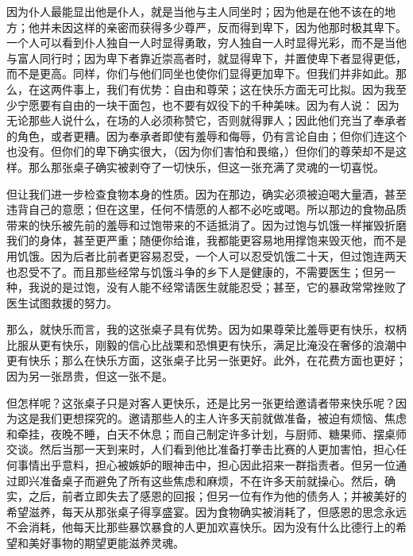 因为仆人最能显出他是仆人，就是当他与主人同坐时；因为他是在他不该在的地方；他并未因这样的亲密而获得多少尊严，反而得到卑下，因为他那时极其卑下。一个人可以看到仆人独自一人时显得勇敢，穷人独自一人时显得光彩，而不是当他与富人同行时；因为卑下者靠近崇高者时，就显得卑下，并置使卑下者显得更低，而不是更高。同样，你们与他们同坐也使你们显得更加卑下。但我们并非如此。那么，在这两件事上，我们有优势：自由和尊荣；这在快乐方面无可比拟。因为我至少宁愿要有自由的一块干面包，也不要有奴役下的千种美味。因为有人说： 因为无论那些人说什么，在场的人必须称赞它，否则就得罪人；因此他们充当了奉承者的角色，或者更糟。因为奉承者即使有羞辱和侮辱，仍有言论自由；但你们连这个也没有。但你们的卑下确实很大，（因为你们害怕和畏缩，）但你们的尊荣却不是这样。那么那张桌子确实被剥夺了一切快乐，但这一张充满了灵魂的一切喜悦。\par

但让我们进一步检查食物本身的性质。因为在那边，确实必须被迫喝大量酒，甚至违背自己的意愿；但在这里，任何不情愿的人都不必吃或喝。所以那边的食物品质带来的快乐被先前的羞辱和过饱带来的不适抵消了。因为过饱与饥饿一样摧毁折磨我们的身体，甚至更严重；随便你给谁，我都能更容易地用撑饱来毁灭他，而不是用饥饿。因为后者比前者更容易忍受，一个人可以忍受饥饿二十天，但过饱连两天也忍受不了。而且那些经常与饥饿斗争的乡下人是健康的，不需要医生；但另一种，我说的是过饱，没有人能不经常请医生就能忍受；甚至，它的暴政常常挫败了医生试图救援的努力。\par

那么，就快乐而言，我的这张桌子具有优势。因为如果尊荣比羞辱更有快乐，权柄比服从更有快乐，刚毅的信心比战栗和恐惧更有快乐，满足比淹没在奢侈的浪潮中更有快乐；那么在快乐方面，这张桌子比另一张更好。此外，在花费方面也更好；因为另一张昂贵，但这一张不是。\par

但怎样呢？这张桌子只是对客人更快乐，还是比另一张更给邀请者带来快乐呢？因为这是我们更想探究的。邀请那些人的主人许多天前就做准备，被迫有烦恼、焦虑和牵挂，夜晚不睡，白天不休息；而自己制定许多计划，与厨师、糖果师、摆桌师交谈。然后当那一天到来时，人们看到他比准备打拳击比赛的人更加害怕，担心任何事情出乎意料，担心被嫉妒的眼神击中，担心因此招来一群指责者。但另一位通过即兴准备桌子而避免了所有这些焦虑和麻烦，不在许多天前就操心。然后，确实，之后，前者立即失去了感恩的回报；但另一位有作为他的债务人；并被美好的希望滋养，每天从那张桌子得享盛宴。因为食物确实被消耗了，但感恩的思念永远不会消耗，他每天比那些暴饮暴食的人更加欢喜快乐。因为没有什么比德行上的希望和美好事物的期望更能滋养灵魂。\par

